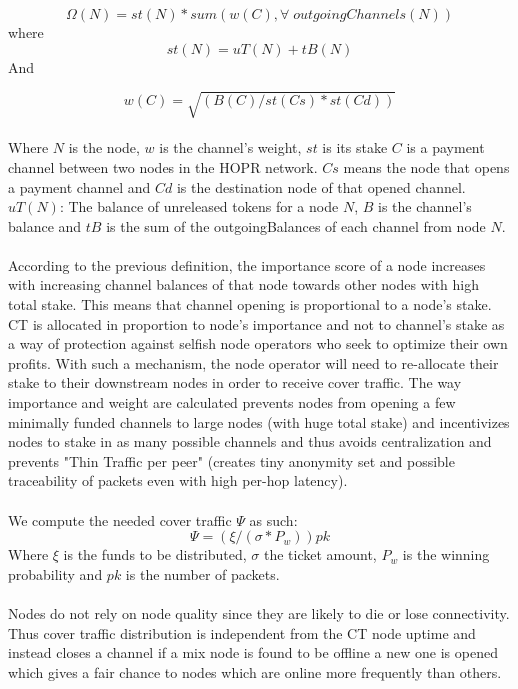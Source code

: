$$\Omega(N) = st(N) * sum(w(C), \forall \; outgoingChannels(N))$$
where 
$$st(N) = uT(N) + tB(N)$$
And 

$$w(C) = \sqrt{(B(C) / st(Cs) * st(Cd))}$$
\\
Where $N$ is the node, $w$ is the channel's weight, $st$ is its stake $C$ is a payment channel between two nodes in the HOPR network. $Cs$ means the node that opens a payment channel and 
$Cd$ is the destination node of that opened channel. $uT(N)$: The balance of unreleased tokens for a node $N$, $B$ is the channel's balance and $tB$ is the sum of the outgoingBalances of each channel from node $N$.
\\~\\ According to the previous definition, the importance score of a node increases with increasing channel balances of that node towards other nodes with high total stake. This means that channel opening is proportional to a node’s stake. CT is allocated in proportion to node's importance and not to channel's stake as a way of protection against selfish node operators who seek to optimize their own profits.
With such a mechanism, the node operator will need to re-allocate their stake to their downstream nodes in order to receive cover traffic. 
The way importance and weight are calculated prevents nodes from opening a few minimally funded channels to large nodes (with huge total stake) and incentivizes nodes to stake in as many possible channels and thus avoids centralization and prevents "Thin Traffic per peer" (creates tiny anonymity set and possible traceability of packets even with high per-hop latency).
\\~\\ We compute the needed cover traffic $\Psi$ as such:
$$\Psi= ( \xi/ (\sigma * P_w)) pk$$
Where $\xi$ is the funds to be distributed, $\sigma$ the ticket amount, $P_w$ is the winning probability and $pk$ is the number of packets.
\\~\\Nodes do not rely on node quality since they are likely to die or lose connectivity. Thus cover traffic distribution is independent from the CT node uptime and instead closes a channel if a mix node is found to be offline a new one is opened which gives a fair chance to nodes which are online more frequently than others. 

